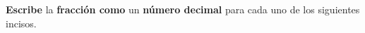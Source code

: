 \question[10] \textbf{Escribe} la \textbf{fracción como} un \textbf{n\'umero decimal} para cada uno de los siguientes incisos.
\begin{multicols}{2}
  \begin{parts}


    
    
  \end{parts}
\end{multicols}
